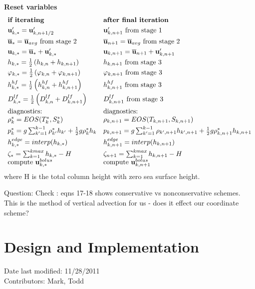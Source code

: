 \documentclass[11pt]{report}
\newcommand{\bea}{\begin{eqnarray}}
\newcommand{\eea}{\end{eqnarray}}
\begin{document}
{\bf Reset variables}
\bea 
\begin{array}{ll}
\mbox{\bf if iterating} & \mbox{\bf after final iteration}\smallskip\\
{\bf u}'_{k,*} = {\bf u}'_{k,n+1/2} & {\bf u}'_{k,n+1} \mbox{ from stage 1}\smallskip\\
\ubtr_{*} = \ubtr_{avg} \mbox{ from stage 2} & \ubtr_{n+1} = \ubtr_{avg} \mbox{ from stage 2}\smallskip\\
{\bf u}_{k,*} = \ubtr_{*} + {\bf u}'_{k,*} & {\bf u}_{k,n+1} = \ubtr_{n+1} + {\bf u}'_{k,n+1}\smallskip\\
h_{k,*} = \frac{1}{2}\left(h_{k,n} +h_{k,n+1}\right)  
 & h_{k,n+1} \mbox{ from stage 3} \smallskip\\
\varphi_{k,*} = \frac{1}{2}\left(\varphi_{k,n} +\varphi_{k,n+1}\right)
 & \varphi_{k,n+1} \mbox{ from stage 3} \smallskip\\
h^{hf}_{k,*} = \frac{1}{2}\left(h^{hf}_{k,n} +h^{hf}_{k,n+1}\right) 
&  h^{hf}_{k,n+1} \mbox{ from stage 3}  \smallskip\\
D^{lf}_{k,*} = \frac{1}{2}\left(D^{lf}_{k,n} +D^{lf}_{k,n+1}\right) &
D^{lf}_{k,n+1} \mbox{ from stage 3}\smallskip\\ \label{rho3}
\mbox{diagnostics:}
& \mbox{diagnostics:} \\
{\rho}_k^* = EOS(T^*_k, S^*_k) 
 & {\rho}_{k,n+1} = EOS(T_{k,n+1}, S_{k,n+1}) \smallskip\\
\label{p3}
{p}_k^* =  g\sum_{k'=1}^{k-1} 
{\rho}_{k'}^* h_{k'}
+ \frac{1}{2}g{\rho}_{k}^* h_k
 & {p}_{k,n+1} =  g\sum_{k'=1}^{k-1} 
{\rho}_{k',n+1} h_{k',n+1}
+ \frac{1}{2}g{\rho}_{k,n+1}^* h_{k,n+1} \smallskip \\
h^{edge}_{k,*} = interp(h_{k,*}) & 
h^{edge}_{k,n+1} = interp(h_{k,n+1}) \smallskip\\
\zeta_* = \sum_{k=1}^{kmax}h_{k,*} - H &
\zeta_{n+1} = \sum_{k=1}^{kmax}h_{k,n+1} - H \\
\mbox{compute }{\bf u}_{k,*}^{bolus} &
\mbox{compute }{\bf u}_{k,n+1}^{bolus} 
\end{array}
\eea
where H is the total column height with zero sea surface height.


Question: Check \cite{Leclair:2011ud}: eqns 17-18 shows conservative vs nonconservative schemes.  This is  the method of vertical advection for us - does it effect our coordinate scheme?

\chapter{Design and Implementation}
Date last modified: 11/28/2011 \\
Contributors: Mark, Todd \\
\end{document}
